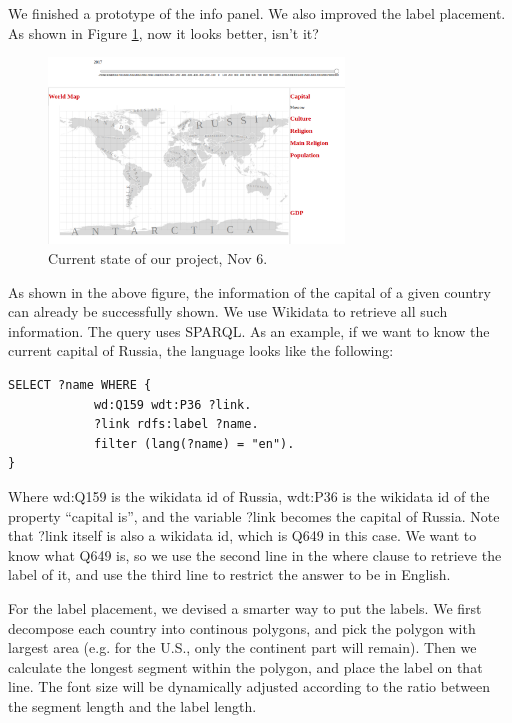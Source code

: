 \documentclass[12pt, fullpage,letterpaper]{article}
\begin{document}
We finished a prototype of the info panel. We also improved the label placement.
As shown in Figure \ref{fig:nov6}, now it looks better, isn't it?

\begin{figure}[h!]
    \begin{center}
        \includegraphics[width=0.7\textwidth]{figs/Nov6.png}
        \caption{Current state of our project, Nov 6.}
        \label{fig:nov6}
    \end{center}
\end{figure}

As shown in the above figure, the information of the capital of a given country
can already be successfully shown. We use Wikidata to retrieve all such information.
The query uses SPARQL. As an example, if we want to know the current capital of Russia,
the language looks like the following:

\begin{verbatim}
SELECT ?name WHERE {
            wd:Q159 wdt:P36 ?link.
            ?link rdfs:label ?name.
            filter (lang(?name) = "en").
}
\end{verbatim}

Where wd:Q159 is the wikidata id of Russia, wdt:P36 is the wikidata id of the property ``capital is'',
and the variable ?link becomes the capital of Russia. Note that ?link itself is also a wikidata id,
which is Q649 in this case. We want to know what Q649 is, so we use the second line in the where clause to retrieve
the label of it, and use the third line to restrict the answer to be in English.

For the label placement, we devised a smarter way to put the labels. We first decompose
each country into continous polygons, and pick the polygon with largest area (e.g. for the U.S., only the continent part will remain).
Then we calculate the longest segment within the polygon, and place the label on that line.
The font size will be dynamically adjusted according to the ratio between the segment length and the label length.
\end{document}
